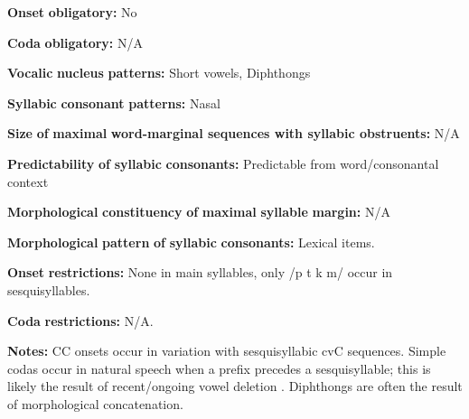 \documentclass[output=paper]{langsci/langscibook}
\begin{document}
\begin{styleBody}
\textbf{Onset} \textbf{obligatory:} No
\end{styleBody}

\begin{styleBody}
\textbf{Coda} \textbf{obligatory:} N/A
\end{styleBody}

\begin{styleBody}
\textbf{Vocalic} \textbf{nucleus} \textbf{patterns:} Short vowels, Diphthongs
\end{styleBody}

\begin{styleBody}
\textbf{Syllabic} \textbf{consonant} \textbf{patterns:} Nasal
\end{styleBody}

\begin{styleBody}
\textbf{Size} \textbf{of} \textbf{maximal} \textbf{word{}-marginal sequences with syllabic obstruents:} N/A
\end{styleBody}

\begin{styleBody}
\textbf{Predictability} \textbf{of} \textbf{syllabic} \textbf{consonants:} Predictable from word/consonantal context
\end{styleBody}

\begin{styleBody}
\textbf{Morphological} \textbf{constituency} \textbf{of} \textbf{maximal} \textbf{syllable} \textbf{margin:} N/A
\end{styleBody}

\begin{styleBody}
\textbf{Morphological} \textbf{pattern} \textbf{of} \textbf{syllabic} \textbf{consonants:} Lexical items.
\end{styleBody}

\begin{styleBody}
\textbf{Onset} \textbf{restrictions:} None in main syllables, only /p t k m/ occur in sesquisyllables.
\end{styleBody}

\begin{styleBody}
\textbf{Coda} \textbf{restrictions:} N/A.
\end{styleBody}

\begin{styleBody}
\textbf{Notes:} CC onsets occur in variation with sesquisyllabic cvC sequences. Simple codas occur in natural speech when a prefix precedes a sesquisyllable; this is likely the result of recent/ongoing vowel deletion \citep[62-4]{Teo2009}. Diphthongs are often the result of morphological concatenation.
\end{styleBody}
\end{document}

